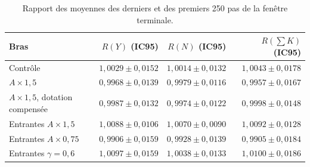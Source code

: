 \begin{table}[htbp]\centering\small
\caption{Rapport des moyennes des derniers et des premiers 250 pas de la fenêtre terminale.}\label{tab:stationnarite}
\begin{tabular}{@{}lrrr@{}}
\toprule
Bras & $R(Y)$ (IC95) & $R(N)$ (IC95) & $R(\sum K)$ (IC95) \\
\midrule
Contrôle & $1{,}0029\pm0{,}0152$ & $1{,}0014\pm0{,}0132$ & $1{,}0043\pm0{,}0178$ \\
$A\times1{,}5$ & $0{,}9968\pm0{,}0139$ & $0{,}9979\pm0{,}0116$ & $0{,}9957\pm0{,}0167$ \\
$A\times1{,}5$, dotation compensée & $0{,}9987\pm0{,}0132$ & $0{,}9974\pm0{,}0122$ & $0{,}9998\pm0{,}0148$ \\
Entrantes $A\times1{,}5$ & $1{,}0088\pm0{,}0106$ & $1{,}0070\pm0{,}0090$ & $1{,}0092\pm0{,}0128$ \\
Entrantes $A\times0{,}75$ & $0{,}9906\pm0{,}0159$ & $0{,}9928\pm0{,}0139$ & $0{,}9905\pm0{,}0184$ \\
Entrantes $\gamma=0{,}6$ & $1{,}0097\pm0{,}0159$ & $1{,}0038\pm0{,}0133$ & $1{,}0100\pm0{,}0186$ \\
\bottomrule\end{tabular}\end{table}
